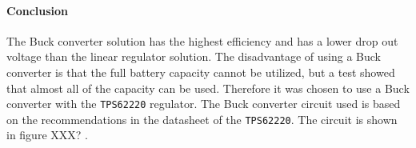 \paragraph{Conclusion}
The Buck converter solution has the highest efficiency and has a lower drop out voltage than the linear regulator solution.
The disadvantage of using a Buck converter is that the full battery capacity cannot be utilized, but a test showed that almost all of the capacity can be used.
Therefore it was chosen to use a Buck converter with the \texttt{TPS62220} regulator. 
The Buck converter circuit used is based on the recommendations in the datasheet of the \texttt{TPS62220}.
The circuit is shown in figure XXX? .
